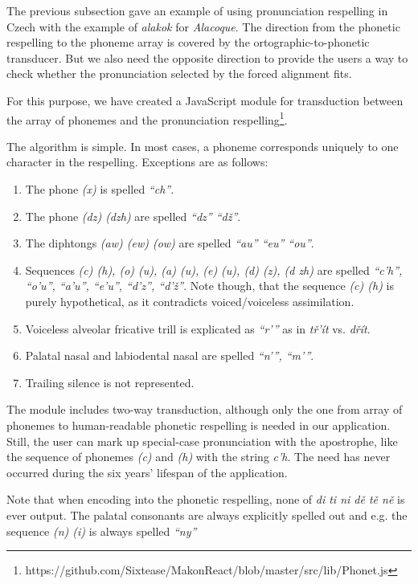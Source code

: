 \documentclass{itatnew}
\begin{document}
The previous subsection gave an example of using pronunciation respelling in
Czech with the example of {\em alakok} for {\em Alacoque}. The direction from
the phonetic respelling to the phoneme array is covered by the
ortographic-to-phonetic transducer. But we also need the opposite direction to
provide the users a way to check whether the pronunciation selected by the
forced alignment fits.

For this purpose, we have created a JavaScript module for transduction between
the array of phonemes and the pronunciation
respelling\footnote{https://github.com/Sixtease/MakonReact/blob/master/src/lib/Phonet.js}.

The algorithm is simple. In most cases, a phoneme corresponds uniquely to one
character in the respelling. Exceptions are as follows:
\begin{enumerate}
\item{The phone {\em (x)} is spelled {\em ``ch''}.}
\item{The phone {\em (dz) (dzh)} are spelled {\em ``dz'' ``dž''}.}
\item{The diphtongs {\em (aw) (ew) (ow)} are spelled {\em ``au'' ``eu'' ``ou''}.}
\item{
    Sequences {\em (c) (h), (o) (u), (a) (u), (e) (u), (d) (z), (d zh) } are
    spelled {\em ``c'h'', ``o'u'', ``a'u'', ``e'u'', ``d'z'', ``d'ž''}. Note
    though, that the sequence {\em (c) (h)} is purely hypothetical, as it
    contradicts voiced/voiceless assimilation.
}
\item{
    Voiceless alveolar fricative trill is explicated as {\em ``r'{}''} as in {\em
    tř'ít} vs. {\em dřít}.
}
\item{
    Palatal nasal and labiodental nasal are spelled {\em ``n'{}'', ``m'{}''}.
}
\item{Trailing silence is not represented.}
\end{enumerate}

The module includes two-way transduction, although only the one from array of
phonemes to human-readable phonetic respelling is needed in our application.
Still, the user can mark up special-case pronunciation with the apostrophe, like
the sequence of phonemes {\em (c)} and {\em (h)} with the string {\em c'h}. The
need has never occurred during the six years' lifespan of the application.

Note that when encoding into the phonetic respelling, none of
{\em di ti ni dě tě ně} is ever output. The palatal consonants are always
explicitly spelled out and e.g. the sequence {\em (n) (i)} is always spelled
{\em``ny''}
\end{document}
